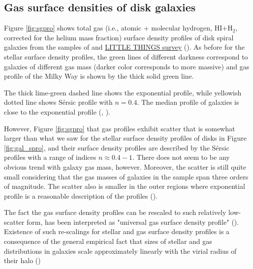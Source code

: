 \subsection{Gas surface densities of disk galaxies}

Figure \ref{fig:sgpro} shows total gas (i.e., atomic + molecular hydrogen, HI$ + $H$_2$, corrected for the helium mass fraction) surface density profiles of disk spiral galaxies from the samples of \href{http://adsabs.harvard.edu/abs/2008AJ....136.2782L}{\citet{leroy_etal08}}  and \href{https://science.nrao.edu/science/surveys/littlethings/the-little-things-survey}{LITTLE THINGS survey} (\href{http://adsabs.harvard.edu/abs/2012AJ....143...47Z}{\citealt{zhang_etal12}}).
As before for the stellar surface density profiles, the green lines of different darkness correspond to galaxies of different gas mass (darker color corresponds to more massive) and gas profile of the Milky Way is shown by the thick solid green line. 

The thick lime-green dashed line shows the exponential profile, while yellowish dotted line shows S\'ersic profile with $n=0.4$.  The median profile of galaxies is close to the exponential profile (\href{http://adsabs.harvard.edu/abs/2012ApJ...756..183B}{\citealt{bigiel_blitz12}}, \href{http://adsabs.harvard.edu/abs/2013ApJ...764L..31K}{\citealt{kravtsov13}}). 

However, Figure \ref{fig:sgpro} that gas profiles exhibit scatter that is somewhat larger than what we saw for the stellar surface density profiles of disks in Figure \ref{fig:gal_spro}, and their surface density profiles are described by the S\'ersic profiles with a range of indices $n\approx 0.4-1$. There does not seem to be any obvious trend with galaxy gas mass, however. Moreover, the scatter is still quite small considering that the gas masses of galaxies in the sample span three orders of magnitude. The scatter also is smaller in the outer regions where exponential profile is a reasonable description of the profiles (\href{http://adsabs.harvard.edu/abs/2014MNRAS.441.2159W}{\citealt{wang_etal14}}).

The fact the gas surface density profiles can be rescaled to such relatively low-scatter form, has been interpreted as "universal gas surface density profile" (\href{http://adsabs.harvard.edu/abs/2012ApJ...756..183B}{\citealt{bigiel_blitz12}}). Existence of such re-scalings for stellar and gas surface density profiles is a consequence of the general empirical fact that sizes of stellar and gas distributions in galaxies scale approximately linearly with the virial radius of their halo (\href{http://adsabs.harvard.edu/abs/2013ApJ...764L..31K}{\citealt{kravtsov13}})

